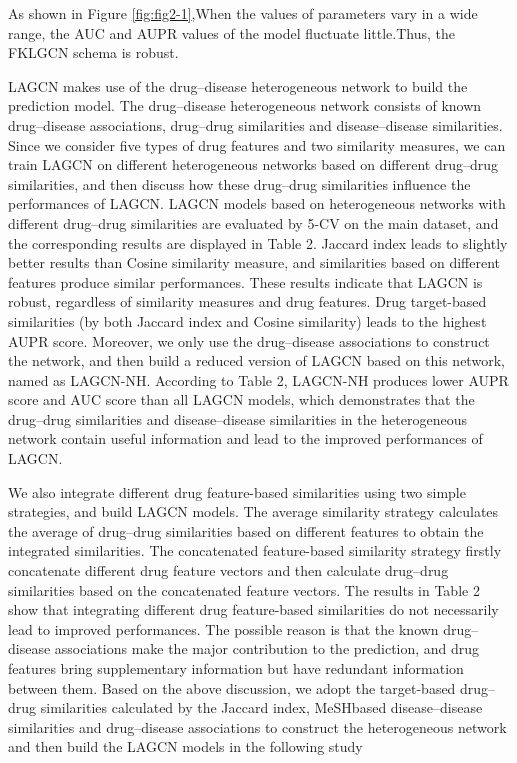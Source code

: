 \documentclass[fleqn,10pt]{wlscirep}
\begin{document}
As shown in Figure \ref{fig:fig2-1},When the values of parameters vary in a wide range, the AUC and AUPR values of the model fluctuate little.Thus, the FKLGCN schema is robust.

LAGCN makes use of the drug–disease heterogeneous network to build the prediction model. The drug–disease heterogeneous network consists of known drug–disease associations, drug–drug similarities and disease–disease similarities. Since we consider five types of drug features and two similarity measures, we can train LAGCN on different heterogeneous networks based on different drug–drug similarities, and then discuss how these drug–drug similarities influence the performances of LAGCN.
LAGCN models based on heterogeneous networks with different drug–drug similarities are evaluated by 5-CV on the main dataset, and the corresponding results are displayed in Table 2.
Jaccard index leads to slightly better results than Cosine similarity measure, and similarities based on different features produce similar performances. These results indicate that LAGCN is robust, regardless of similarity measures and drug features. Drug target-based similarities (by both Jaccard index and Cosine similarity) leads to the highest AUPR score. Moreover, we only use the drug–disease associations to construct the network, and then build a reduced version of LAGCN based on this network, named as LAGCN-NH. According to Table 2, LAGCN-NH produces lower AUPR score and AUC score than all LAGCN models, which demonstrates that the drug–drug similarities and disease–disease similarities in the heterogeneous network contain useful information and lead to the improved performances of LAGCN.

We also integrate different drug feature-based similarities using two simple strategies, and build LAGCN models. The average similarity strategy calculates the average of drug–drug similarities based on different features to obtain the integrated similarities. The concatenated feature-based similarity strategy firstly concatenate different drug feature vectors and then calculate drug–drug similarities based on the concatenated feature vectors. The results in Table 2 show that integrating different drug feature-based similarities do not necessarily lead to improved performances. The possible reason is that the known drug–disease associations make the major contribution to the prediction, and drug features bring supplementary information but have redundant information between them. Based on the above discussion, we adopt the target-based drug–drug similarities calculated by the Jaccard index, MeSHbased disease–disease similarities and drug–disease associations to construct the heterogeneous network and then build the LAGCN models in the following study
\end{document}
